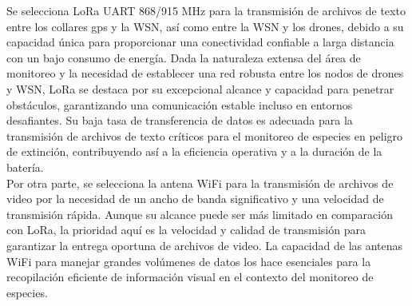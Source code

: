 Se selecciona LoRa UART 868/915 MHz para la transmisión de archivos de texto entre los collares gps y la WSN, así como entre la WSN y los drones, debido a su capacidad única para proporcionar una conectividad confiable a larga distancia con un bajo consumo de energía. Dada la naturaleza extensa del área de monitoreo y la necesidad de establecer una red robusta entre los nodos de drones y WSN, LoRa se destaca por su excepcional alcance y capacidad para penetrar obstáculos, garantizando una comunicación estable incluso en entornos desafiantes. Su baja tasa de transferencia de datos es adecuada para la transmisión de archivos de texto críticos para el monitoreo de especies en peligro de extinción, contribuyendo así a la eficiencia operativa y a la duración de la batería.\\
Por otra parte, se selecciona la antena WiFi para la transmisión de archivos de video por la necesidad de un ancho de banda significativo y una velocidad de transmisión rápida. Aunque su alcance puede ser más limitado en comparación con LoRa, la prioridad aquí es la velocidad y calidad de transmisión para garantizar la entrega oportuna de archivos de video. La capacidad de las antenas WiFi para manejar grandes volúmenes de datos los hace esenciales para la recopilación eficiente de información visual en el contexto del monitoreo de especies.

